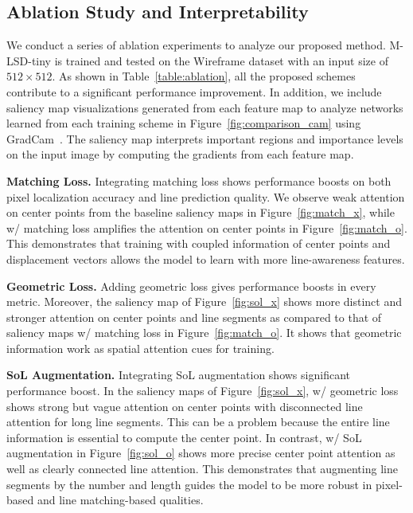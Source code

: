 \documentclass[letterpaper]{article} \usepackage{aaai22}  \usepackage{times}  \usepackage{helvet}  \usepackage{courier}  \usepackage[hyphens]{url}  \usepackage{graphicx} \urlstyle{rm} \def\UrlFont{\rm}  \usepackage{natbib}  \usepackage{caption} \DeclareCaptionStyle{ruled}{labelfont=normalfont,labelsep=colon,strut=off} \frenchspacing  \setlength{\pdfpagewidth}{8.5in}  \setlength{\pdfpageheight}{11in}  \usepackage{algorithm}
\begin{document}
\subsection{Ablation Study and Interpretability}
\label{sec:ablation}
We conduct a series of ablation experiments to analyze our proposed method.
M-LSD-tiny is trained and tested on the Wireframe dataset with an input size of $512 \times 512$.
As shown in Table~\ref{table:ablation}, all the proposed schemes contribute to a significant performance improvement.
In addition, we include saliency map visualizations generated from each feature map to analyze networks learned from each training scheme in Figure~\ref{fig:comparison_cam} using GradCam~\cite{selvaraju2017grad}.
The saliency map interprets important regions and importance levels on the input image by computing the gradients from each feature map.

\begin{comment}
\textbf{Baseline and Augmentation. }
The baseline model is trained with M-LSD-tiny backbone, including only the TP representation and no other proposed schemes.
We observe that adding horizontal and vertical flips, shearing, rotation, and scaling input augmentation on the baseline model shows small performance improvement.
\end{comment}

\textbf{Matching Loss. }
Integrating matching loss shows performance boosts on both pixel localization accuracy and line prediction quality.
We observe weak attention on center points from the baseline saliency maps in Figure~\ref{fig:match_x}, while w/ matching loss amplifies the attention on center points in Figure~\ref{fig:match_o}.
This demonstrates that training with coupled information of center points and displacement vectors allows the model to learn with more line-awareness features.

\textbf{Geometric Loss. }
Adding geometric loss gives performance boosts in every metric.
Moreover, the saliency map of Figure~\ref{fig:sol_x} shows more distinct and stronger attention on center points and line segments as compared to that of saliency maps w/ matching loss in Figure~\ref{fig:match_o}.
It shows that geometric information work as spatial attention cues for training.

\textbf{SoL Augmentation. }
Integrating SoL augmentation shows significant performance boost.
In the saliency maps of Figure~\ref{fig:sol_x}, w/ geometric loss shows strong but vague attention on center points with disconnected line attention for long line segments.
This can be a problem because the entire line information is essential to compute the center point.
In contrast, w/ SoL augmentation in Figure~\ref{fig:sol_o} shows more precise center point attention as well as clearly connected line attention.
This demonstrates that augmenting line segments by the number and length guides the model to be more robust in pixel-based and line matching-based qualities.
\end{document}
